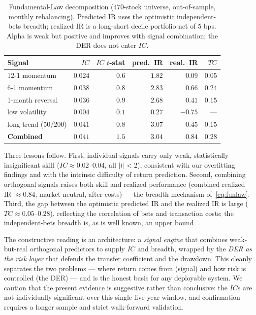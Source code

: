 \documentclass[11pt]{article}
\theoremstyle{definition}
\begin{document}
\begin{table}[h]
\centering
\begin{tabular}{lrrrrr}
\toprule
Signal & $IC$ & $IC$ $t$-stat & pred.\ IR & real.\ IR & $TC$ \\
\midrule
12-1 momentum       & $0.024$ & $0.6$ & $1.82$ & $0.09$ & $0.05$ \\
6-1 momentum        & $0.038$ & $0.8$ & $2.83$ & $0.66$ & $0.24$ \\
1-month reversal    & $0.036$ & $0.9$ & $2.68$ & $0.41$ & $0.15$ \\
low volatility      & $0.004$ & $0.1$ & $0.27$ & $-0.75$ & --- \\
long trend (50/200) & $0.041$ & $0.8$ & $3.07$ & $0.45$ & $0.15$ \\
\midrule
\textbf{Combined}   & $0.041$ & $1.5$ & $3.04$ & $\mathbf{0.84}$ & $0.28$ \\
\bottomrule
\end{tabular}
\caption{Fundamental-Law decomposition (470-stock universe, out-of-sample, monthly
rebalancing). Predicted IR uses the optimistic independent-bets breadth; realized IR is
a long-short decile portfolio net of $5$ bps. Alpha is weak but positive and improves
with signal combination; the DER does not enter $IC$.}
\label{tab:ic}
\end{table}

Three lessons follow. First, individual signals carry only weak, statistically
insignificant skill ($IC\approx0.02$--$0.04$, all $|t|<2$), consistent with our
overfitting findings and with the intrinsic difficulty of return prediction. Second,
combining orthogonal signals raises both skill and realized performance (combined
realized IR $\approx0.84$, market-neutral, after costs) --- the breadth mechanism
of~\eqref{eq:funlaw}. Third, the gap between the optimistic predicted IR and the
realized IR is large ($TC\approx0.05$--$0.28$), reflecting the correlation of bets and
transaction costs; the independent-bets breadth is, as is well known, an upper
bound~\cite{clarke2002}.

The constructive reading is an architecture: a \emph{signal engine} that combines
weak-but-real orthogonal predictors to supply $IC$ and breadth, wrapped by the
\emph{DER as the risk layer} that defends the transfer coefficient and the drawdown.
This cleanly separates the two problems --- where return comes from (signal) and how
risk is controlled (the DER) --- and is the honest basis for any deployable system. We
caution that the present evidence is suggestive rather than conclusive: the $IC$s are
not individually significant over this single five-year window, and confirmation
requires a longer sample and strict walk-forward validation.
\end{document}
